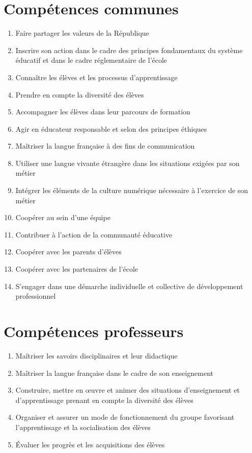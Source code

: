 \def\theme{\large Compétences communes à tous les professeurs et personnels d'éducation}

\section{Compétences communes}

\begin{enumerate}[label=\color{Violet} \textbf{CC\arabic* -}]
    \item Faire partager les valeurs de la République
    \item Inscrire son action dans le cadre des principes fondamentaux du système éducatif et dans le cadre réglementaire de l'école
    \item Connaître les élèves et les processus d'apprentissage
    \item Prendre en compte la diversité des élèves
    \item Accompagner les élèves dans leur parcours de formation
    \item Agir en éducateur responsable et selon des principes éthiques
    \item Maîtriser la langue française à des fins de communication
    \item Utiliser une langue vivante étrangère dans les situations exigées par son métier
    \item Intégrer les éléments de la culture numérique nécessaire à l'exercice de son métier
    \item Coopérer au sein d'une équipe
    \item Contribuer à l'action de la communauté éducative
    \item Coopérer avec les parents d'élèves
    \item Coopérer avec les partenaires de l'école
    \item S'engager dans une démarche individuelle et collective de développement professionnel
\end{enumerate}

\section{Compétences professeurs}

\begin{enumerate}[label=\color{Violet} \textbf{P\arabic* -}]
    \item Maîtriser les savoirs disciplinaires et leur didactique
    \item Maîtriser la langue française dans le cadre de son enseignement
    \item Construire, mettre en œuvre et animer des situations d'enseignement et d'apprentissage prenant en compte la diversité des élèves
    \item Organiser et assurer un mode de fonctionnement du groupe favorisant l'apprentissage et la socialisation des élèves
    \item Évaluer les progrès et les acquisitions des élèves
\end{enumerate}
